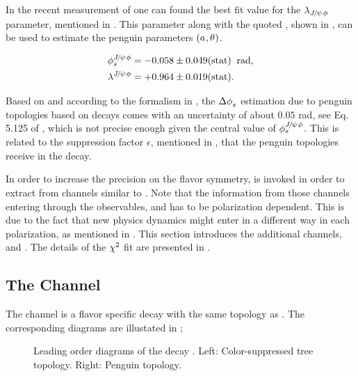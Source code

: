 In the recent \lhcb measurement \cite{phis-3fb-paper} of \phis one can found the best fit value for the $\lambda_{{J\mskip -3mu/\mskip -2mu\psi\mskip 2mu}\phi}$
parameter, mentioned in . This parameter along with the quoted \phis, shown in ,
can be used to estimate the penguin parameters $(a_{},\theta_{})$.

\begin{subequations}
  \label{phis_lambda_result}
  \begin{align}
    \centering
    \phis^{\jpsi\phi}     &=  -0.058 \pm 0.049(\text{stat})  \;\; \text{rad},\\
    \lambda^{\jpsi\phi}   &=  +0.964 \pm 0.019(\text{stat}).
  \end{align}
\end{subequations}

\noindent Based on  and according to the formalism in , the $\Delta\phi_{s}^{}$ estimation
due to penguin topologies based on \BsJpsiPhi decays comes with an uncertainty of about $0.05$ rad, see Eq. 5.125 of \cite{DeBruyn-thesis}, which is not precise
enough given the central value of $\phi_{s}^{{J\mskip -3mu/\mskip -2mu\psi\mskip 2mu}\phi}$. This is related to the suppression factor $\epsilon$, mentioned in
, that the penguin topologies receive in the \BsJpsiPhi decay.

In order to increase the precision on \DeltaPhis{} the \grpsuthree flavor symmetry,
is invoked in order to extract \DeltaPhis{} from channels similar to \BsJpsiPhi.
Note that the information from those channels entering through the observables,  and 
has to be polarization dependent. This is due to the fact that new physics dynamics might enter in a different way in each polarization,
as mentioned in \cite{DeBruyn-thesis}.
This section introduces the additional channels, \BsJpsiKst and \BdJpsiRho. The details of the $\chi^2$ fit are presented in .


\subsection{The \BsJpsiKst Channel}
\label{bsjpsikst_chanell}

The \BsJpsiKst channel is a flavor specific decay with the same topology as \BsJpsiPhi. The corresponding
diagrams are illustated in ;

\begin{figure}[h]
  \centering
  \scalebox{0.9}{\sffamily }
  \caption{Leading order diagrams of the decay \BsJpsiKst. Left: Color-suppressed tree topology. Right: Penguin topology.}
  \label{bs2jpsikst}
\end{figure}

